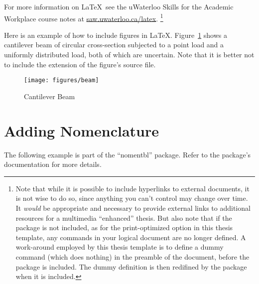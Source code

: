 For more information on \LaTeX\, see the uWaterloo Skills for the Academic Workplace 
course notes at \href{http://saw.uwaterloo.ca/latex}{saw.uwaterloo.ca/latex}. 
\footnote{
Note that while it is possible to include hyperlinks to external documents,
it is not wise to do so, since anything you can't control may change over time. 
It \emph{would} be appropriate and necessary to provide external links to 
additional resources for a multimedia ``enhanced'' thesis. 
But also note that if the  package is not included, 
as for the print-optimized option in this thesis template, any  
commands in your logical document are no longer defined.
A work-around employed by this thesis template is to define a dummy  
command (which does nothing) in the preamble of the document, 
before the  package is included. 
The dummy definition is then redifined by the
 package when it is included.
}




Here is an example of how to include figures in \LaTeX. 
Figure~\ref{fig.beam} shows a cantilever beam of circular cross-section
subjected to a point load and a uniformly distributed load, both of which are uncertain. Note that it is better not to include the extension of the figure's source file.

\begin{figure}[!htbp]
 \begin{center}
  \texttt{[image: figures/beam]}
 \end{center}
\caption{Cantilever Beam}
\label{fig.beam}
\end{figure}



\section{Adding Nomenclature}

The following example is part of the ``nomentbl'' package. Refer to the package's documentation for more details.

